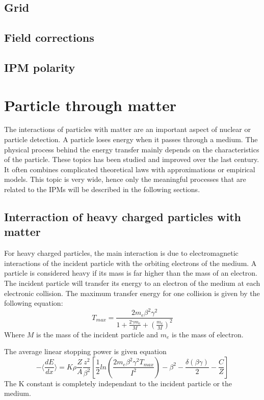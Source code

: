 \begin{refsection}
	\subsection{Grid}
	\subsection{Field corrections}
	\subsection{IPM polarity}
	\section{Particle through matter}
	The interactions of particles with matter are an important aspect of nuclear or particle detection\cite[]{Leo1994, Knoll2010}.
	A particle loses energy when it passes through a medium.
	The physical process behind the energy transfer mainly depends on the characteristics of the particle.
	These topics has been studied and improved over the last century.
	It often combines complicated theoretical laws with approximations or empirical models.
	This topic is very wide, hence only the meaningful processes that are related to the IPMs will be described in the following sections.

	\subsection{Interraction of heavy charged particles with matter}
	For heavy charged particles, the main interaction is due to electromagnetic interactions of the incident particle with the orbiting electrons of the medium.
	A particle is considered heavy if its mass is far higher than the mass of an electron.
	The incident particle will transfer its energy to an electron of the medium at each electronic collision.
	The maximum transfer energy for one collision is given by the following equation:
	\begin{equation}
		T_{max} = \frac{2 m_{e} \beta^{2} \gamma^{2}}{1 + \frac{2 \gamma m_{e} }{M} + \left( \frac{m_{e}}{M} \right)^{2}}
	\end{equation}
	Where \(M\) is the mass of the incident particle and \(m_{e}\) is the mass of electron.

	The average linear stopping power is given equation\cite[]{Bethe1930} \cite[p. 446]{Tanabashi2018}
	\begin{equation}
		- \bigg \langle \frac{dE}{dx} \bigg \rangle =K \rho \frac{Z}{A} \frac{z^{2}}{\beta^{2}} \left[\frac{1}{2} ln \left(\frac{2 m_{e} \beta^{2} \gamma^{2} T_{max}}{I^{2}} \right) - \beta^{2} - \frac{\delta(\beta \gamma)}{2} - \frac{C}{Z} \right]
	\end{equation}
	The K constant is completely independant to the incident particle or the medium.


\end{refsection}
